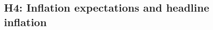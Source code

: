 \documentclass{article}
\begin{document}



\subsection{H4: Inflation expectations and headline inflation}
\end{document}
